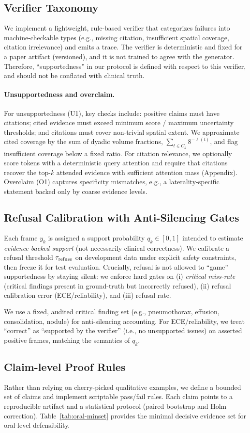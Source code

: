 \subsection{Verifier Taxonomy}
We implement a lightweight, rule-based verifier that categorizes failures into machine-checkable types (e.g., missing citation, insufficient spatial coverage, citation irrelevance) and emits a trace.
The verifier is deterministic and fixed for a paper artifact (versioned), and it is not trained to agree with the generator.
Therefore, ``supportedness'' in our protocol is defined with respect to this verifier, and should not be conflated with clinical truth.

\paragraph{Unsupportedness and overclaim.}
For unsupportedness (U1), key checks include: positive claims must have citations; cited evidence must exceed minimum score / maximum uncertainty thresholds; and citations must cover non-trivial spatial extent.
We approximate cited coverage by the sum of dyadic volume fractions, $\sum_{t\in C_k} 8^{-\ell(t)}$, and flag insufficient coverage below a fixed ratio.
For citation relevance, we optionally score tokens with a deterministic query attention and require that citations recover the top-$k$ attended evidence with sufficient attention mass (Appendix).
Overclaim (O1) captures specificity mismatches, e.g., a laterality-specific statement backed only by coarse evidence levels.

\subsection{Refusal Calibration with Anti-Silencing Gates}
Each frame $y_k$ is assigned a support probability $q_k \in [0,1]$ intended to estimate \emph{evidence-backed support} (not necessarily clinical correctness).
We calibrate a refusal threshold $\tau_{\mathrm{refuse}}$ on development data under explicit safety constraints, then freeze it for test evaluation.
Crucially, refusal is not allowed to ``game'' supportedness by staying silent: we enforce hard gates on (i) \emph{critical miss-rate} (critical findings present in ground-truth but incorrectly refused), (ii) refusal calibration error (ECE/reliability), and (iii) refusal rate.

We use a fixed, audited critical finding set (e.g., pneumothorax, effusion, consolidation, nodule) for anti-silencing accounting.
For ECE/reliability, we treat ``correct'' as ``supported by the verifier'' (i.e., no unsupported issues) on asserted positive frames, matching the semantics of $q_k$.

\subsection{Claim-level Proof Rules}
Rather than relying on cherry-picked qualitative examples, we define a bounded set of claims and implement scriptable pass/fail rules.
Each claim points to a reproducible artifact and a statistical protocol (paired bootstrap and Holm correction).
Table~\ref{tab:oral-minset} provides the minimal decisive evidence set for oral-level defensibility.
